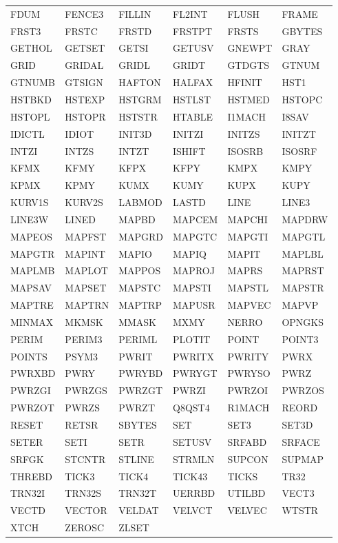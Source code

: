 \documentclass[twoside,11pt,nolof,noabs]{starlink}
\begin{document}
\begin{center}
\begin{tabular}{p{20mm}p{20mm}p{20mm}p{20mm}p{20mm}p{20mm}}
FDUM   & FENCE3 & FILLIN & FL2INT & FLUSH  & FRAME\\
FRST3  & FRSTC  & FRSTD  & FRSTPT & FRSTS  & GBYTES\\
GETHOL & GETSET & GETSI  & GETUSV & GNEWPT & GRAY\\
GRID   & GRIDAL & GRIDL  & GRIDT  & GTDGTS & GTNUM\\
GTNUMB & GTSIGN & HAFTON & HALFAX & HFINIT & HST1\\
HSTBKD & HSTEXP & HSTGRM & HSTLST & HSTMED & HSTOPC\\
HSTOPL & HSTOPR & HSTSTR & HTABLE & I1MACH & I8SAV\\
IDICTL & IDIOT  & INIT3D & INITZI & INITZS & INITZT\\
INTZI  & INTZS  & INTZT  & ISHIFT & ISOSRB & ISOSRF\\
KFMX   & KFMY   & KFPX   & KFPY   & KMPX   & KMPY\\
KPMX   & KPMY   & KUMX   & KUMY   & KUPX   & KUPY\\
KURV1S & KURV2S & LABMOD & LASTD  & LINE   & LINE3\\
LINE3W & LINED  & MAPBD  & MAPCEM & MAPCHI & MAPDRW\\
MAPEOS & MAPFST & MAPGRD & MAPGTC & MAPGTI & MAPGTL\\
MAPGTR & MAPINT & MAPIO  & MAPIQ  & MAPIT  & MAPLBL\\
MAPLMB & MAPLOT & MAPPOS & MAPROJ & MAPRS  & MAPRST\\
MAPSAV & MAPSET & MAPSTC & MAPSTI & MAPSTL & MAPSTR\\
MAPTRE & MAPTRN & MAPTRP & MAPUSR & MAPVEC & MAPVP\\
MINMAX & MKMSK  & MMASK  & MXMY   & NERRO  & OPNGKS\\
PERIM  & PERIM3 & PERIML & PLOTIT & POINT  & POINT3\\
POINTS & PSYM3  & PWRIT  & PWRITX & PWRITY & PWRX\\
PWRXBD & PWRY   & PWRYBD & PWRYGT & PWRYSO & PWRZ\\
PWRZGI & PWRZGS & PWRZGT & PWRZI  & PWRZOI & PWRZOS\\
PWRZOT & PWRZS  & PWRZT  & Q8QST4 & R1MACH & REORD\\
RESET  & RETSR  & SBYTES & SET    & SET3   & SET3D\\
SETER  & SETI   & SETR   & SETUSV & SRFABD & SRFACE\\
SRFGK  & STCNTR & STLINE & STRMLN & SUPCON & SUPMAP\\
THREBD & TICK3  & TICK4  & TICK43 & TICKS  & TR32\\
TRN32I & TRN32S & TRN32T & UERRBD & UTILBD & VECT3\\
VECTD  & VECTOR & VELDAT & VELVCT & VELVEC & WTSTR\\
XTCH   & ZEROSC & ZLSET
\end{tabular}
\latex{\end{scriptsize}}
\normalfont
\end{center}
\end{document}
